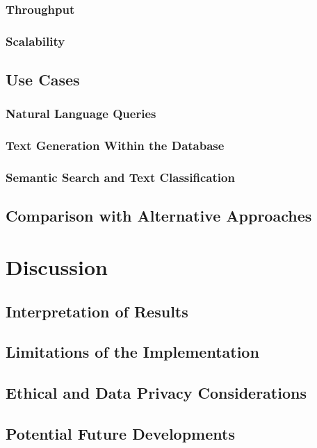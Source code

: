 \documentclass{article}
\begin{document}
\subsubsection{Throughput}
\subsubsection{Scalability}

\subsection{Use Cases}
\subsubsection{Natural Language Queries}
\subsubsection{Text Generation Within the Database}
\subsubsection{Semantic Search and Text Classification}

\subsection{Comparison with Alternative Approaches}

\newpage

\section{Discussion}

\subsection{Interpretation of Results}
\subsection{Limitations of the Implementation}
\subsection{Ethical and Data Privacy Considerations}
\subsection{Potential Future Developments}
\end{document}

